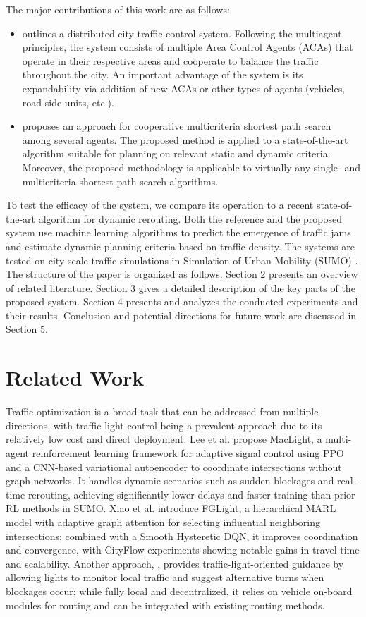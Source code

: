 \documentclass[sigconf]{aamas}
\begin{document}
The major contributions of this work are as follows:
\begin{itemize}
    \item outlines a distributed city traffic control system. Following the multiagent principles, the system consists of multiple Area Control Agents (ACAs) that operate in their respective areas and cooperate to balance the traffic throughout the city. An important advantage of the system is its expandability via addition of new ACAs or other types of agents (vehicles, road-side units, etc.).
    \item proposes an approach for cooperative multicriteria shortest path search among several agents. The proposed method is applied to a state-of-the-art algorithm suitable for planning on relevant static and dynamic criteria. Moreover, the proposed methodology is applicable to virtually any single- and multicriteria shortest path search algorithms.
\end{itemize}

To test the efficacy of the system, we compare its operation to a recent state-of-the-art algorithm \cite{reference} for dynamic rerouting. Both the reference and the proposed system use machine learning algorithms to predict the emergence of traffic jams and estimate dynamic planning criteria based on traffic density. The systems are tested on city-scale traffic simulations in Simulation of Urban Mobility (SUMO) \cite{SUMO}. The structure of the paper is organized as follows. Section 2 presents an overview of related literature. Section 3 gives a detailed description of the key parts of the proposed system. Section 4 presents and analyzes the conducted experiments and their results. Conclusion and potential directions for future work are discussed in Section 5.

\section{Related Work}
Traffic optimization is a broad task that can be addressed from multiple directions, with traffic light control being a prevalent approach due to its relatively low cost and direct deployment. Lee et al. \cite{maclight} propose MacLight, a multi-agent reinforcement learning framework for adaptive signal control using PPO and a CNN-based variational autoencoder to coordinate intersections without graph networks. It handles dynamic scenarios such as sudden blockages and real-time rerouting, achieving significantly lower delays and faster training than prior RL methods in SUMO. Xiao et al. \cite{fglight} introduce FGLight, a hierarchical MARL model with adaptive graph attention for selecting influential neighboring intersections; combined with a Smooth Hysteretic DQN, it improves coordination and convergence, with CityFlow experiments showing notable gains in travel time and scalability. Another approach, \cite{MNTR}, provides traffic-light-oriented guidance by allowing lights to monitor local traffic and suggest alternative turns when blockages occur; while fully local and decentralized, it relies on vehicle on-board modules for routing and can be integrated with existing routing methods.
\end{document}
